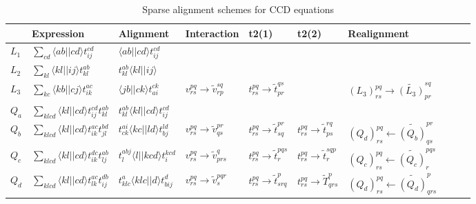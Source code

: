 \begin{table}[th]
\centering
\caption{Sparse alignment schemes for CCD equations}
\label{tab:sparse_alignments_CCD}
\begin{tabular}{llllllllll}
  & Expression   &  Alignment  & Interaction   &  t2(1)   & t2(2) & Realignment \\  \hline
$L_1$   & $ \sum_{cd} \langle ab \vert \vert cd \rangle t^{cd}_{ij}$   & $\langle ab \vert \vert cd \rangle t^{cd}_{ij}$    \\
$L_2$   & $ \sum_{kl} \langle kl \vert \vert ij \rangle t^{ab}_{kl}$   & $t^{ab}_{kl} \langle kl \vert \vert ij \rangle $   \\
$L_3$   & $ \sum_{kc} \langle kb \vert \vert cj \rangle t^{ac}_{ik}$   & $\langle jb \vert \vert ck \rangle t^{ck}_{ai}$  & $v^{pq}_{rs} \rightarrow \tilde{v}^{sq}_{rp}$  &  $t^{pq}_{rs} \rightarrow \tilde{t}^{qs}_{pr}$  & & $(L_3)^{pq}_{rs} \rightarrow \tilde{(L_3)}^{sq}_{pr}$ \\
$Q_a$   &$ \sum_{klcd} \langle kl \vert \vert cd \rangle t^{cd}_{ij} t^{ab}_{kl}$   & $t^{ab}_{kl} \langle kl \vert \vert cd \rangle t^{cd}_{ij}$  &    \\
$Q_b$   &$ \sum_{klcd} \langle kl \vert \vert cd \rangle t^{ac}_{ik} t^{bd}_{jl}$   & $t^{ai}_{ck} \langle kc \vert \vert ld \rangle t^{ld}_{bj}$ & $v^{pq}_{rs} \rightarrow \tilde{v}^{pr}_{qs}$  & $t^{pq}_{rs} \rightarrow \tilde{t}^{pr}_{sq}$  &$t^{pq}_{rs} \rightarrow \tilde{t}^{rq}_{ps}$& $(Q_d)^{pq}_{rs} \leftarrow \tilde{(Q_b)}^{pr}_{qs}$ \\
$Q_c$   &$ \sum_{klcd} \langle kl \vert \vert cd \rangle t^{dc}_{ik} t^{ab}_{lj}$   & $ t^{abj}_{l} \langle l \vert \vert kcd \rangle t^{kcd}_{i}$  & $v^{pq}_{rs} \rightarrow \tilde{v}^{q}_{prs}$  & $t^{pq}_{rs} \rightarrow \tilde{t}^{pqs}_{r}$  &$t^{pq}_{rs} \rightarrow \tilde{t}^{sqp}_{r}$&$(Q_c)^{pq}_{rs} \leftarrow \tilde{(Q_c)}^{pqs}_{r}$ \\
$Q_d$   &$ \sum_{klcd}\langle kl \vert \vert cd \rangle t^{ac}_{lk} t^{db}_{ij}$   & $t^{a}_{klc} \langle klc \vert \vert d \rangle t^{d}_{bij}$  & $v^{pq}_{rs} \rightarrow \tilde{v}^{pqr}_{s}$ & $t^{pq}_{rs} \rightarrow \tilde{t}^{p}_{srq}$  & $t^{pq}_{rs} \rightarrow \tilde{T}^{p}_{qrs}$ &$(Q_d)^{pq}_{rs} \leftarrow \tilde{(Q_d)}^{p}_{qrs}$ \\
\end{tabular}
\end{table}



\FloatBarrier
\clearpage

